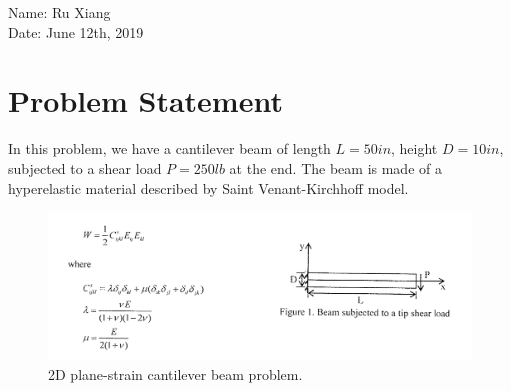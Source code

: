 \documentclass{article}
\begin{document}
\vspace*{0.25cm}

\hrulefill

\thispagestyle{empty}

\begin{center}
\begin{large}
\end{large}

\hrulefill

\vspace*{5cm}
\begin{Large}
\end{Large}

	\vspace{7em}
	{Name: Ru Xiang}\\
	\vspace{1.5em}
	{Date: June 12th, 2019}


\end{center}


\vfill


\hfill

\newpage



\section{Problem Statement}

	In this problem, we have a cantilever beam of length $L = 50 in$, height $D = 10 in$, subjected to a shear load $P = 250 lb$ at the end. The beam is made of a hyperelastic material described by Saint Venant-Kirchhoff model.
	


\vspace*{0.5em}
 \begin{figure}[H]
	\centering
	\includegraphics[scale=0.6]{problem.png}
	\caption{2D plane-strain cantilever beam problem.}
\end{figure}
\end{document}
